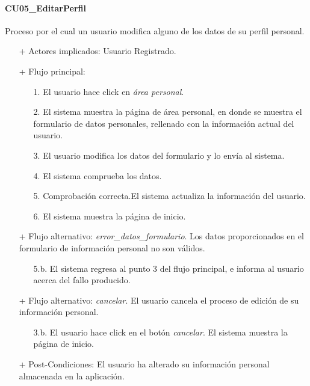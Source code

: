 \documentclass[a4paper]{article}
\begin{document}
            \paragraph{CU05\_EditarPerfil}
                Proceso por el cual un usuario modifica alguno de los datos de su perfil personal.
                \begin{itemize}
                    \item[+] Actores implicados: Usuario Registrado.
                    \item[+] Flujo principal:
                    \begin{enumerate}
                        \item[1.] El usuario hace click en \emph{área personal}.
                        \item[2.] El sistema muestra la página de área personal, en donde se muestra el formulario de datos personales, rellenado con la información actual del usuario.
                        \item[3.] El usuario modifica los datos del formulario y lo envía al sistema.
                        \item[4.] El sistema comprueba los datos.
                        \item[5.] Comprobación correcta.El sistema actualiza la información del usuario.
                        \item[6.] El sistema muestra la página de inicio.
                    \end{enumerate}
                    \item[+] Flujo alternativo: \emph{error\_datos\_formulario}. Los datos proporcionados en el formulario de información personal no son válidos.
                    \begin{itemize}
                        \item[5.b.] El sistema regresa al punto 3 del flujo principal, e informa al usuario acerca del fallo producido.
                    \end{itemize}
                    \item[+] Flujo alternativo: \emph{cancelar}. El usuario cancela el proceso de edición de su información personal.
                    \begin{itemize}
                        \item[3.b.] El usuario hace click en el botón \emph{cancelar}. El sistema muestra la página de inicio.
                    \end{itemize}
                    \item[+] Post-Condiciones: El usuario ha alterado su información personal almacenada en la aplicación.
                \end{itemize}
\end{document}
